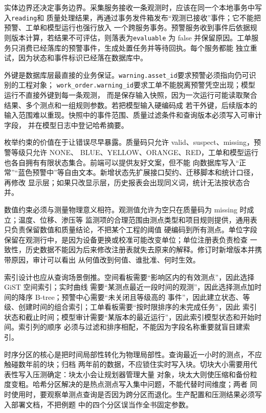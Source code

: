 实体边界还决定事务边界。采集服务接收一条观测时，应该在同一个本地事务中写入\texttt{reading}和
质量处理结果，再通过事务发件箱发布“观测已接收”事件；它不能把预警、工单和模型运行也强行放入
一个跨服务事务。预警服务收到事件后依据规则版本计算，若结果不可评估，则落表为\texttt{evaluable}
为 false 并保留原因。工单服务只消费已经落库的预警事件，生成处置任务并等待回执。每个服务都能
独立重试，因为状态和事件标识已经落在数据库中。

外键是数据库层最直接的业务保证。\texttt{warning.asset\_id}要求预警必须指向仍可识别的工程对象；
\texttt{work\_order.warning\_id}要求工单不能脱离预警凭空出现；模型运行不直接外键到每一条观测，
而是保存输入快照，因为一次运行可能读取聚合结果、多个测点和一组规则参数。若把模型输入硬编码成
若干外键，后续版本的输入范围难以重现。快照中的事件范围、质量过滤条件和查询版本必须写入可审计字段，
并在模型日志中登记哈希摘要。

枚举约束的价值在于让错误尽早暴露。质量码只允许 valid、suspect、missing，预警等级只允许 NONE、
BLUE、YELLOW、ORANGE、RED，工单和模型运行也各自拥有有限状态集合。前端可以提供友好文案，但不能
向数据库写入“正常”“蓝色预警中”等自由文本。新增状态先扩展接口契约、迁移脚本和统计口径，再修改
显示层；如果只改显示层，历史报表会出现同义词，统计无法按状态合并。

数值约束必须与测量物理意义相符。观测值允许为空只在质量码为 missing 时成立；温度、位移、渗压等
监测项的合理范围由测点类型和项目规则提供，通用表只负责保留数值和质量结论，不把某个工程的阈值
硬编码到所有测点。单位字段保留在观测行中，是因为设备更换或校准可能改变单位；单位注册表负责检查
一致性，历史数据不能因为后来修改注册表就失去原来的解释。修订时新增版本并携带原因，审计可以看出
从何值改到何值、谁批准、何时生效。

索引设计也应从查询场景倒推。空间看板需要“影响区内的有效测点”，因此选择 GiST 空间索引；实时曲线
需要“某测点最近一段时间的观测”，因此选择测点加时间的降序 B-tree；预警中心需要“未关闭且等级高的
事件”，因此建立状态、等级、创建时间的组合索引；工单看板需要“按时限排序的未完成任务”，因此
索引状态和截止时间；模型审计需要“某版本的最近运行”，因此索引模型状态和开始时间。索引列的顺序
必须与过滤和排序相配，不能因为字段名称重要就盲目建索引。

时序分区的核心是把时间局部性转化为物理局部性。查询最近一小时的测点，不应触碰数年前的块；归档
两年前的数据，不应锁住实时写入块。切块大小需要用代表性写入压测确定：块太小会让规划器管理大量
对象，块太大则使压缩和备份粒度变粗。哈希分区解决的是热点测点写入集中问题，不能代替时间维度；两者
同时使用时，要观察单测点查询是否因为跨分区而退化。生产配置和压测结果必须写入部署文档，不把例题
中的四个分区误当作全书固定参数。

